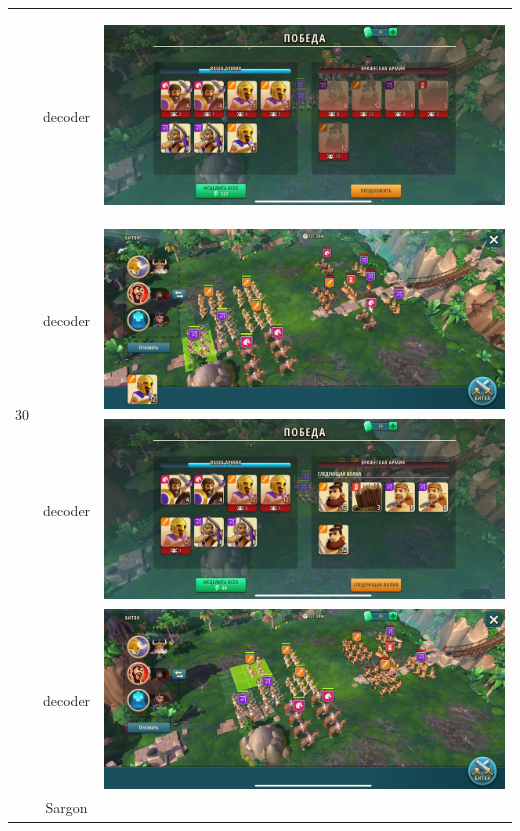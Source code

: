 \begin{longtable}{|c|c|c|}
	\hline
	\multirow{15}{*}{30} & decoder &
	\hypertarget{fight30}{\includegraphics[width=0.75\linewidth]{./parts/media/TreasureHunt/30/decoder/photo_2022-04-07_10-00-32.jpg}} \\
	& decoder &
	\includegraphics[width=0.75\linewidth]{./parts/media/TreasureHunt/30/decoder/photo_2022-04-07_09-59-28.jpg} \\
	& decoder &
	\includegraphics[width=0.75\linewidth]{./parts/media/TreasureHunt/30/decoder/photo_2022-04-07_09-59-40.jpg} \\
	& decoder &
	\includegraphics[width=0.75\linewidth]{./parts/media/TreasureHunt/30/decoder/photo_2022-04-07_10-00-22.jpg} \\
	\hline
	\multirow{12}{*}{31} & Sargon &

\end{longtable}
